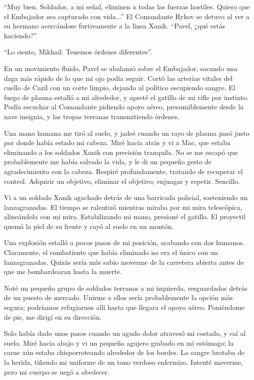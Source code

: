 \documentclass[spanish,12pt,a4paper,oneside,titlepage]{book}
\begin{document}
    ``Muy bien. Soldados, a mi señal, eliminen a todas las fuerzas hostiles. Quiero que el Embajador sea capturado con vida...'' El Comandante Rykov se detuvo al ver a su hermano acercándose furtivamente a la línea Xanik. ``Pavel, ¿qué estás haciendo?''

    ``Lo siento, Mikhail. Tenemos órdenes diferentes''.

    En un movimiento fluido, Pavel se abalanzó sobre el Embajador, sacando una daga más rápido de lo que mi ojo podía seguir. Cortó las arterias vitales del cuello de Cazil con un corte limpio, dejando al político escupiendo sangre. El fuego de plasma estalló a mi alrededor, y apreté el gatillo de mi rifle por instinto. Podía escuchar al Comandante pidiendo apoyo aéreo, presumiblemente desde la nave insignia, y las tropas terranas transmitiendo órdenes.

    Una mano humana me tiró al suelo, y jadeé cuando un rayo de plasma pasó justo por donde había estado mi cabeza. Miré hacia atrás y vi a Mac, que estaba eliminando a los soldados Xanik con precisión tranquila. No se me escapó que probablemente me había salvado la vida, y le di un pequeño gesto de agradecimiento con la cabeza. Respiré profundamente, tratando de recuperar el control. Adquirir un objetivo, eliminar el objetivo, enjuagar y repetir. Sencillo.

    Vi a un soldado Xanik agachado detrás de una barricada policial, sosteniendo un lanzagranadas. El tiempo se ralentizó mientras miraba por mi mira telescópica, alineándola con mi mira. Estabilizando mi mano, presioné el gatillo. El proyectil quemó la piel de su frente y cayó al suelo en un montón.

    Una explosión estalló a pocos pasos de mi posición, acabando con dos humanos. Claramente, el combatiente que había eliminado no era el único con un lanzagranadas. Quizás sería más sabio moverme de la carretera abierta antes de que me bombardearan hasta la muerte.

    Noté un pequeño grupo de soldados terranos a mi izquierda, resguardados detrás de un puesto de mercado. Unirme a ellos sería probablemente la opción más segura; podríamos refugiarnos allí hasta que llegara el apoyo aéreo. Poniéndome de pie, me dirigí en su dirección.

    Solo había dado unos pasos cuando un agudo dolor atravesó mi costado, y caí al suelo. Miré hacia abajo y vi un pequeño agujero grabado en mi estómago; la carne aún estaba chisporroteando alrededor de los bordes. La sangre brotaba de la herida, tiñendo mi uniforme de un tono verdoso enfermizo. Intenté moverme, pero mi cuerpo se negó a obedecer.
\end{document}
